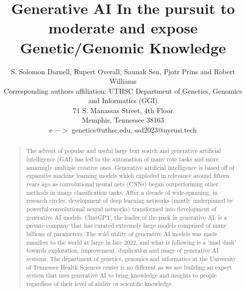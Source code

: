 \documentclass[letterpaper]{article}
\begin{document}
%
\title{Generative AI In the pursuit to moderate and expose\\ Genetic/Genomic Knowledge}
\author{S. Solomon Darnell, Rupert Overall, Saunak Sen, Pjotr Prins and Robert Williams\\
Corresponding authors affiliation: UTHSC Department of Genetics, Genomics and Informatics (GGI)\\
71 S. Manassas Street, 4th Floor\\
Memphis, Tennessee 38163\\
e $->$ genetics@uthsc.edu, ssd2023@nyeusi.tech
}
\maketitle
\begin{abstract}
\begin{quote}
The advent of popular and useful large text search and generative artificial intelligence (GAI) has led to the automation of many rote tasks and more amazingly multiple creative ones.
Generative artificial intelligence is based off of expansive machine learning models which exploded in relevance around fifteen years ago as convolutional neural nets (CNNs) began outperforming other methods in image classification tasks.
After a decade of wide-spanning, in research circles, development of deep learning networks (mostly underpinned by powerful convolutional neural networks) transformed into development of generative AI models.
ChatGPT, the leader of the pack in generative AI, is a private company that has curated extremely large models comprised of many billions of parameters.
The wild utility of generative AI models was made manifest to the world at large in late 2022, and what is following is a `mad dash' towards exploration, improvement, duplication and usage of generative AI systems. 
The department of genetics, genomics and informatics at the University of Tennessee Health Sciences center is no different as we are building an expert system that uses generative AI to bring knowledge and insights to people regardless of their level of ability or scientific knowledge.
\end{quote}
\end{abstract}



%

%

%





%


\end{document}
